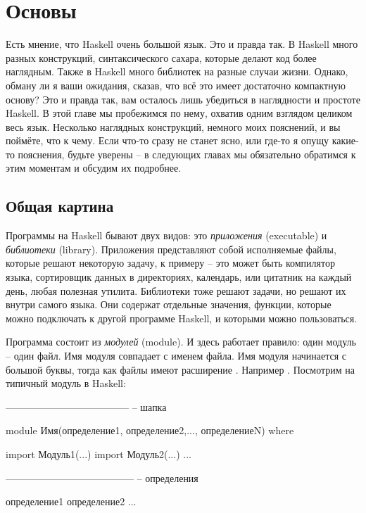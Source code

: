 \setcounter{chapter}{0}
\chapter{Основы}

Есть мнение, что Haskell очень большой язык. Это и правда так.
В Haskell много разных конструкций, синтаксического сахара, которые
делают код более наглядным. Также в Haskell много библиотек на
разные случаи жизни. Однако, обману ли я 
ваши ожидания, сказав, что всё это имеет достаточно компактную 
основу? Это и правда так, вам осталось лишь убедиться в 
наглядности и простоте Haskell. В этой главе мы пробежимся по 
нему, охватив одним взглядом целиком весь язык. Несколько 
наглядных конструкций, немного моих пояснений, и вы поймёте, что 
к чему. Если что-то сразу не станет ясно, или где-то я опущу 
какие-то пояснения, будьте уверены -- в следующих главах мы 
обязательно обратимся к этим моментам и обсудим их подробнее. 

\section{Общая картина}


Программы на Haskell бывают двух видов: это 
\emph{приложения} (executable) и \emph{библиотеки} (library).
Приложения представляют собой исполняемые файлы, которые решают
некоторую задачу, к примеру -- это может быть компилятор языка, 
сортировщик данных в директориях, календарь, или цитатник на каждый день,
любая полезная утилита.
Библиотеки тоже решают задачи, но решают их внутри самого языка.
Они содержат отдельные значения, функции, которые можно подключать
к другой программе Haskell, и которыми можно пользоваться.


Программа состоит из  \emph{модулей} (module). И здесь работает 
правило: один модуль -- один файл. Имя модуля совпадает с именем файла.
Имя модуля начинается с большой буквы, тогда как файлы имеют 
расширение .
Например . Посмотрим на типичный модуль в Haskell:

\begin{code}
--------------------------------------
-- шапка

module Имя(определение1, определение2,..., определениеN) where

import Модуль1(...)
import Модуль2(...)
...

---------------------------------------
-- определения

определение1
определение2
...
\end{code}



